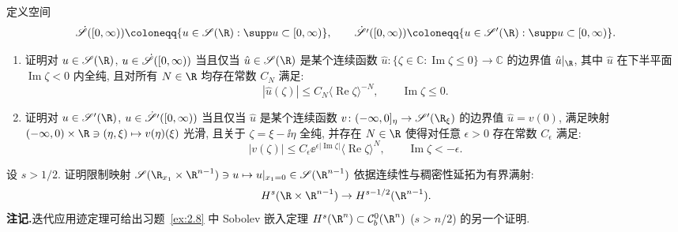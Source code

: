 \begin{exer}\label{ex:2.14}
定义空间
\begin{equation}\label{eq:2.79}
    \dot{\Schwartz}([0, \infty)) \defeq \{u \in \Schwartz(\R) : \supp u \subset [0, \infty)\}, \qquad \dot{\TempDistr}([0, \infty)) \defeq \{u \in \TempDistr(\R) : \supp u \subset [0, \infty)\}.
\end{equation}
\begin{enumerate}
    \item 证明对 $u \in \Schwartz(\R)$, $u \in \dot{\mathscr{S}}([0, \infty))$ 当且仅当 $\hat{u} \in \Schwartz(\R)$ 是某个连续函数 $\hat{u} \colon \{\zeta \in \mathbb{C} : \operatorname{Im} \zeta \le 0\} \to \mathbb{C}$ 的边界值 $\hat{u}|_\R$, 其中 $\hat{u}$ 在下半平面 $\operatorname{Im} \zeta < 0$ 内全纯, 且对所有 $N \in \R$ 均存在常数 $C_N$ 满足:
    \begin{equation}\label{eq:2.80}
        |\hat{u}(\zeta)| \le C_N \langle \operatorname{Re} \zeta \rangle^{-N}, \qquad \operatorname{Im} \zeta \le 0.
    \end{equation}
    \item 证明对 $u \in \TempDistr(\R)$, $u \in \dot{\mathscr{S}'}([0, \infty))$ 当且仅当 $\hat{u}$ 是某个连续函数 $v \colon (-\infty, 0]_\eta \to \TempDistr(\R_\xi)$ 的边界值 $\hat{u} = v(0)$, 满足映射 $(-\infty, 0) \times \R \ni (\eta, \xi) \mapsto v(\eta)(\xi)$ 光滑, 且关于 $\zeta = \xi - \ii \eta$ 全纯, 并存在 $N \in \R$ 使得对任意 $\epsilon > 0$ 存在常数 $C_\epsilon$ 满足:
    \begin{equation}\label{eq:2.81}
        |v(\zeta)| \le C_\epsilon \ee^{\epsilon |\!\operatorname{Im} \zeta|} \langle \operatorname{Re} \zeta \rangle^N, \qquad \operatorname{Im} \zeta < -\epsilon.
    \end{equation}
\end{enumerate}
\end{exer}

\begin{exer}[迹定理]\label{ex:2.15}
设 $s > 1/2$. 证明限制映射 $\Schwartz(\R_{x_1} \times \R^{n-1}) \ni u \mapsto u|_{x_1=0} \in \Schwartz(\R^{n-1})$ 依据连续性与稠密性延拓为有界满射:
\begin{equation}\label{eq:2.82}
    H^s(\R \times \R^{n-1}) \to H^{s - 1/2}(\R^{n-1}).
\end{equation}
\noindent\textbf{注记.}\enspace 迭代应用迹定理可给出习题~\ref{ex:2.8} 中 Sobolev 嵌入定理 $H^s(\R^n) \subset \mathcal{C}_b^0(\R^n)$ ($s > n/2$) 的另一个证明.
\end{exer}

